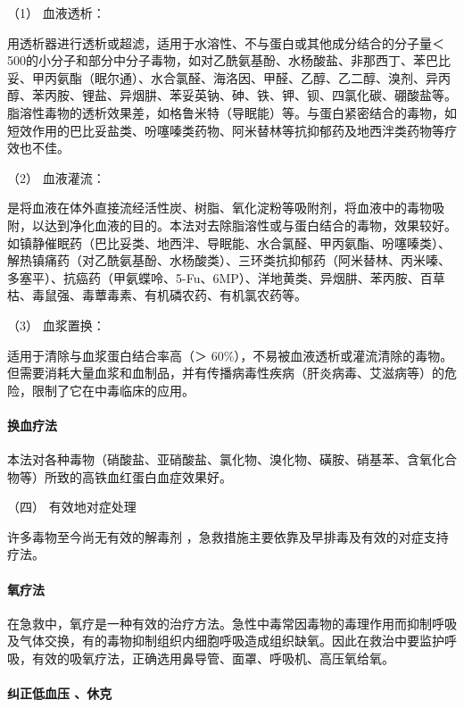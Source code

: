 \hypertarget{text00130.htmlux5cux23CHP5-1-3-2-3-2-1}{}
（1） 血液透析：

用透析器进行透析或超滤，适用于水溶性、不与蛋白或其他成分结合的分子量＜
500的小分子和部分中分子毒物，如对乙酰氨基酚、水杨酸盐、非那西丁、苯巴比妥、甲丙氨酯（眠尔通）、水合氯醛、海洛因、甲醛、乙醇、乙二醇、溴剂、异丙醇、苯丙胺、锂盐、异烟肼、苯妥英钠、砷、铁、钾、钡、四氯化碳、硼酸盐等。脂溶性毒物的透析效果差，如格鲁米特（导眠能）等。与蛋白紧密结合的毒物，如短效作用的巴比妥盐类、吩噻嗪类药物、阿米替林等抗抑郁药及地西泮类药物等疗效也不佳。

\hypertarget{text00130.htmlux5cux23CHP5-1-3-2-3-2-2}{}
（2） 血液灌流：

是将血液在体外直接流经活性炭、树脂、氧化淀粉等吸附剂，将血液中的毒物吸附，以达到净化血液的目的。本法对去除脂溶性或与蛋白结合的毒物，效果较好。如镇静催眠药（巴比妥类、地西泮、导眠能、水合氯醛、甲丙氨酯、吩噻嗪类）、解热镇痛药（对乙酰氨基酚、水杨酸类）、三环类抗抑郁药（阿米替林、丙米嗪、多塞平）、抗癌药（甲氨蝶呤、5-Fu、6MP）、洋地黄类、异烟肼、苯丙胺、百草枯、毒鼠强、毒蕈毒素、有机磷农药、有机氯农药等。

\hypertarget{text00130.htmlux5cux23CHP5-1-3-2-3-2-3}{}
（3） 血浆置换：

适用于清除与血浆蛋白结合率高（＞
60\%），不易被血液透析或灌流清除的毒物。但需要消耗大量血浆和血制品，并有传播病毒性疾病（肝炎病毒、艾滋病等）的危险，限制了它在中毒临床的应用。

\paragraph{换血疗法}

本法对各种毒物（硝酸盐、亚硝酸盐、氯化物、溴化物、磺胺、硝基苯、含氧化合物等）所致的高铁血红蛋白血症效果好。

\hypertarget{text00130.htmlux5cux23CHP5-1-3-2-4}{}
（四） 有效地对症处理

许多毒物至今尚无有效的解毒剂
，急救措施主要依靠及早排毒及有效的对症支持疗法。

\paragraph{氧疗法}

在急救中，氧疗是一种有效的治疗方法。急性中毒常因毒物的毒理作用而抑制呼吸及气体交换，有的毒物抑制组织内细胞呼吸造成组织缺氧。因此在救治中要监护呼吸，有效的吸氧疗法，正确选用鼻导管、面罩、呼吸机、高压氧给氧。

\paragraph{纠正低血压 、休克}

